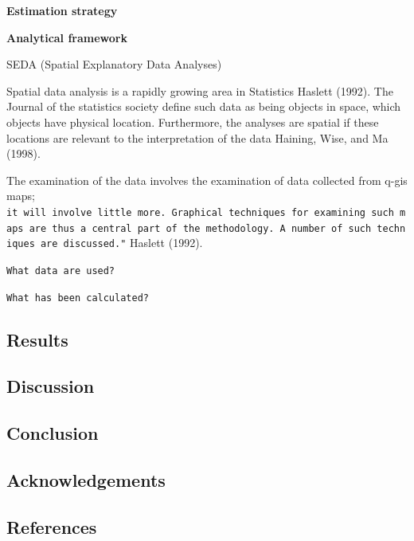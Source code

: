 \documentclass[
  10,
  a4paper,
]{article}
\begin{document}
\textbf{Estimation strategy}

\textbf{Analytical framework}

SEDA (Spatial Explanatory Data Analyses)

Spatial data analysis is a rapidly growing area in Statistics Haslett
(1992). The Journal of the statistics society define such data as being
objects in space, which objects have physical location. Furthermore, the
analyses are spatial if these locations are relevant to the
interpretation of the data Haining, Wise, and Ma (1998).

The examination of the data involves the examination of data collected
from q-gis maps;
\texttt{it\ will\ involve\ little\ more.\ Graphical\ techniques\ for\ examining\ such\ maps\ are\ thus\ a\ central\ part\ of\ the\ methodology.\ A\ number\ of\ such\ techniques\ are\ discussed."}
Haslett (1992).

\texttt{What\ data\ are\ used?}

\texttt{What\ has\ been\ calculated?}

\hypertarget{results}{%
\subsection{Results}\label{results}}

\hypertarget{discussion}{%
\subsection{Discussion}\label{discussion}}

\hypertarget{conclusion}{%
\subsection{Conclusion}\label{conclusion}}

\hypertarget{acknowledgements}{%
\subsection{Acknowledgements}\label{acknowledgements}}

\hypertarget{references}{%
\subsection*{References}\label{references}}
\end{document}
